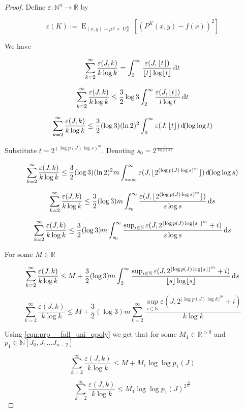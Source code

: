 \documentclass{article}
\numberwithin{equation}{section}
\theoremstyle{definition}
\theoremstyle{plain}
\DeclareMathOperator{\E}{E}
\DeclareMathOperator{\Un}{U}
\newcommand{\Nats}{\mathbb{N}}
\newcommand{\Reals}{\mathbb{R}}
\newcommand{\NatPolyJ}{\Nats[J_0, J_1 \ldots J_{n-2}]}
\newcommand{\Floor}[1]{\lfloor #1 \rfloor}
\begin{document}
\begin{proof}

Define ${\varepsilon: \Nats^n \rightarrow \Reals}$ by

\[\varepsilon(K):=\E_{(x,y) \sim \mu^K \times \Un_P^K}[(P^K(x,y)-f(x))^2]\]

We have

\[\sum_{k=2}^\infty \frac{\varepsilon(J,k)}{k \log k}=\int_2^\infty \frac{\varepsilon(J,\Floor{t})}{\Floor{t} \log \Floor{t}} \dif t\]

\[\sum_{k=2}^\infty \frac{\varepsilon(J,k)}{k \log k} \leq \frac{3}{2} \log 3 \int_2^\infty \frac{\varepsilon(J,\Floor{t})}{t \log t} \dif t\]

\[\sum_{k=2}^\infty \frac{\varepsilon(J,k)}{k \log k} \leq \frac{3}{2} (\log 3) (\ln 2)^2 \int_0^\infty \varepsilon(J,\Floor{t}) \dif (\log \log t)\]

Substitute ${t=2^{(\log p(J) \log s)^m}}$. Denoting ${s_0=2^{\frac{1}{\log p(J)}}}$

\[\sum_{k=2}^\infty \frac{\varepsilon(J,k)}{k \log k} \leq \frac{3}{2} (\log 3) (\ln 2)^2 m \int_{s=s_0}^\infty \varepsilon(J,\Floor{2^{(\log p(J) \log s)^m}}) \dif (\log \log s)\]

\[\sum_{k=2}^\infty \frac{\varepsilon(J,k)}{k \log k} \leq \frac{3}{2} (\log 3) m \int_{s_0}^\infty \frac{\varepsilon(J,\Floor{2^{(\log p(J) \log s)^m}})}{s \log s} \dif s\]

\[\sum_{k=2}^\infty \frac{\varepsilon(J,k)}{k \log k} \leq \frac{3}{2} (\log 3) m \int_{s_0}^\infty \frac{\sup_{i \in \Nats} \varepsilon(J,2^{\Floor{\log p(J) \log \Floor{s}}^m}+i)}{s \log s} \dif s\]

For some ${M \in \Reals}$

\[\sum_{k=2}^\infty \frac{\varepsilon(J,k)}{k \log k} \leq M + \frac{3}{2} (\log 3) m \int_{2}^\infty \frac{\sup_{i \in \Nats} \varepsilon(J,2^{\Floor{\log p(J) \log \Floor{s}}^m}+i)}{\Floor{s} \log \Floor{s}} \dif s\]

\[\sum_{k=2}^\infty \frac{\varepsilon(J,k)}{k \log k} \leq M + \frac{3}{2} (\log 3) m \sum_{k=2}^\infty \frac{\sup_{i \in \Nats} \varepsilon(J,2^{\Floor{\log p(J) \log k}^m}+i)}{k \log k}\]

Using \ref{eqn:prp__fall_uni_qpoly} we get that for some ${M_1 \in \Reals^{>0}}$ and ${p_1 \in \NatPolyJ}$

\[\sum_{k=2}^\infty \frac{\varepsilon(J,k)}{k \log k} \leq M + M_1 \log \log p_1(J)\]

\[\sum_{k=2}^\infty \frac{\varepsilon(J,k)}{k \log k} \leq M_1 \log \log p_1(J)^{2^{\frac{M}{M_1}}}\]
%
\end{proof}
\end{document}
